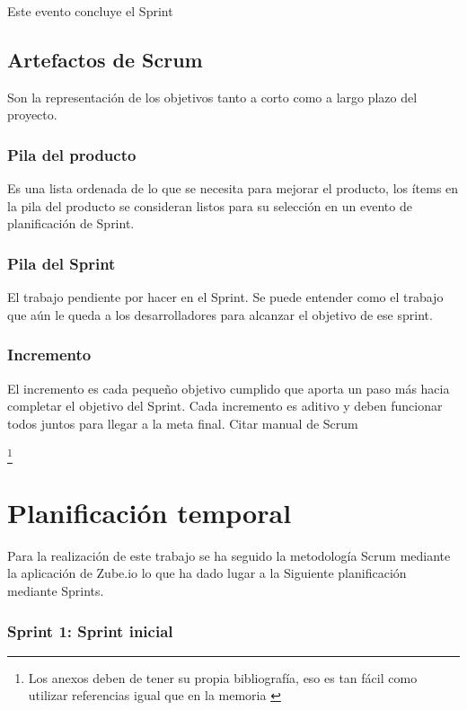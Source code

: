 Este evento concluye el Sprint

\subsection{Artefactos de Scrum}

Son la representación de los objetivos tanto a corto como a largo plazo del proyecto.

\subsubsection{Pila del producto}

Es una lista ordenada de lo que se necesita para mejorar el producto, los ítems en la pila del producto se consideran listos para su selección en un evento de planificación de Sprint.

\subsubsection{Pila del Sprint}

El trabajo pendiente por hacer en el Sprint. Se puede entender como el trabajo que aún le queda a los desarrolladores para alcanzar el objetivo de ese sprint.

\subsubsection{Incremento}

El incremento es cada pequeño objetivo cumplido que aporta un paso más hacia completar el objetivo del Sprint. Cada incremento es aditivo y deben funcionar todos juntos para llegar a la meta final. \cite{} Citar manual de Scrum %

\footnote{Los anexos deben de tener su propia bibliografía, eso es tan fácil como utilizar referencias igual que en la memoria \cite{bortolot2005}}

\section{Planificación temporal}

Para la realización de este trabajo se ha seguido la metodología Scrum mediante la aplicación de Zube.io lo que ha dado lugar a la Siguiente planificación mediante Sprints.

\subsubsection{Sprint 1: Sprint inicial}

